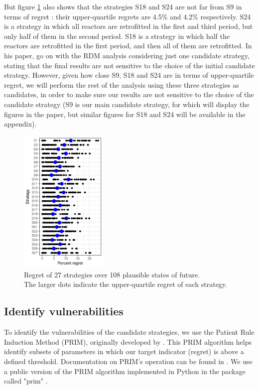 But figure \ref{fig:regret} also shows that the strategies S18 and S24 are not far from S9 in terms of regret : their upper-quartile regrets are 4.5\% and 4.2\% respectively. 
S24 is a strategy in which all reactors are retrofitted in the first and third period, but only half of them in the second period. S18 is a strategy in which half the reactors are retrofitted in the first period, and then all of them are retrofitted.
In his paper, \citet{Lempert2006} go on with the RDM analysis considering just one candidate strategy, stating that the final results are not sensitive to the choice of the initial candidate strategy. However, given how close S9, S18 and S24 are in terms of upper-quartile regret, we will perform the rest of the analysis using these three strategies as candidates, in order to make sure our results are not sensitive to the choice of the candidate strategy (S9 is our main candidate strategy, for which will display the figures in the paper, but similar figures for S18 and S24 will be available in the appendix).

\begin{figure}[!ht]
	\centering
	\includegraphics[height=7cm]{figures/regret.pdf}
	\caption{Regret of 27 strategies over 108 plausible states of future. \\ The larger dots indicate the upper-quartile regret of each strategy.}
	\label{fig:regret}
\end{figure}

\subsection{Identify vulnerabilities}

To identify the vulnerabilities of the candidate strategies, we use the Patient Rule Induction Method (PRIM), originally developed by \citet{Friedman1999}. This PRIM algorithm helps identify subsets of parameters in which our target indicator (regret) is above a defined threshold. Documentation on PRIM's operation can be found in \citet{Bryant2010}. We use a public version of the PRIM algorithm implemented in Python in the package called "prim" \citep{Hadka}. 

